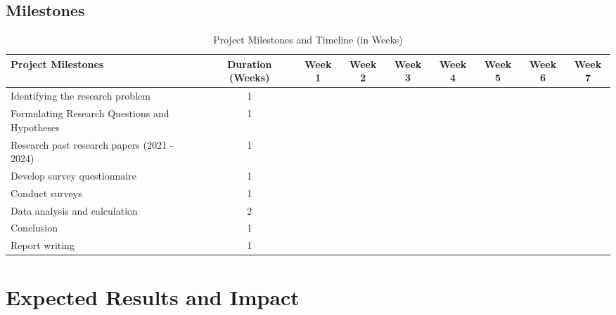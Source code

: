 \documentclass[a4paper, 12pt]{article}
\begin{document}
\subsection{Milestones}
\begin{table}[H]

\begin{tabular}{|p{3cm}|c|c|c|c|c|c|c|c|}
    \hline
    \textbf{Project Milestones}       & \textbf{Duration (Weeks)} & \textbf{Week 1} & \textbf{Week 2} & \textbf{Week 3} & \textbf{Week 4} & \textbf{Week 5} & \textbf{Week 6} & \textbf{Week 7} \\ 
    \hline
    Identifying the research problem   & 1 & \cellcolor{gray!30} & & & & & & \\ 
    \hline
    Formulating Research Questions and Hypotheses & 1 & & \cellcolor{gray!30} & & & & & \\ 
    \hline
    Research past research papers (2021 - 2024) & 1 & & & \cellcolor{gray!30} & & & & \\
    \hline
    Develop survey questionnaire       & 1 & & & & \cellcolor{gray!30} & & & \\ 
    \hline
    Conduct surveys                    & 1 & & & & & \cellcolor{gray!30} & & \\ 
    \hline
    Data analysis and calculation      & 2 & & & & & \cellcolor{gray!30} & \cellcolor{gray!30} & \\ 
    \hline
    Conclusion                         & 1 & & & & & & \cellcolor{gray!30} & \\ 
    \hline
    Report writing                     & 1 & & & & & & & \cellcolor{gray!30} \\ 
    \hline
\end{tabular}
\centering
\caption{Project Milestones and Timeline (in Weeks)}
\end{table}

\section{Expected Results and Impact}
\end{document}
